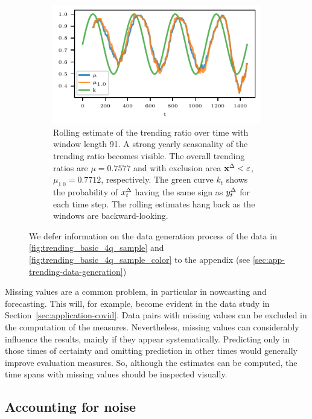 \begin{figure}
\begin{subfigure}[t]{.48\textwidth}
    \includegraphics{plots/illustrative_examples/trending_ratio_time_series.pdf}
    \caption{Rolling estimate of the trending ratio over time with window length 91. A strong yearly seasonality of the trending ratio becomes visible. The overall trending ratios are $\mu = 0.7577$ and with exclusion area $\mathbf{x}^{\Delta} < \varepsilon$, $\mu_{1.0} = 0.7712$, respectively. The green curve $k_t$ shows the probability of $x^{\Delta}_t$ having the same sign as $y^{\Delta}_t$ for each time step. The rolling estimates hang back as the windows are backward-looking.}\label{fig:trending_ratio_time_series}
    \end{subfigure}%
    \caption{We defer information on the data generation process of the data in \ref{fig:trending_basic_4q_sample} and \ref{fig:trending_basic_4q_sample_color} to the appendix (see \ref{sec:app-trending-data-generation})}
\end{figure}

Missing values are a common problem, in particular in nowcasting and forecasting.
This will, for example, become evident in the data study in Section~\ref{sec:application-covid}.
Data pairs with missing values can be excluded in the computation of the measures.
Nevertheless, missing values can considerably influence the results, mainly if they appear systematically.
Predicting only in those times of certainty and omitting prediction in other times would generally improve evaluation measures.
So, although the estimates can be computed, the time spans with missing values should be inspected visually.


\subsection{Accounting for noise}\label{subsec:trending-noise}

